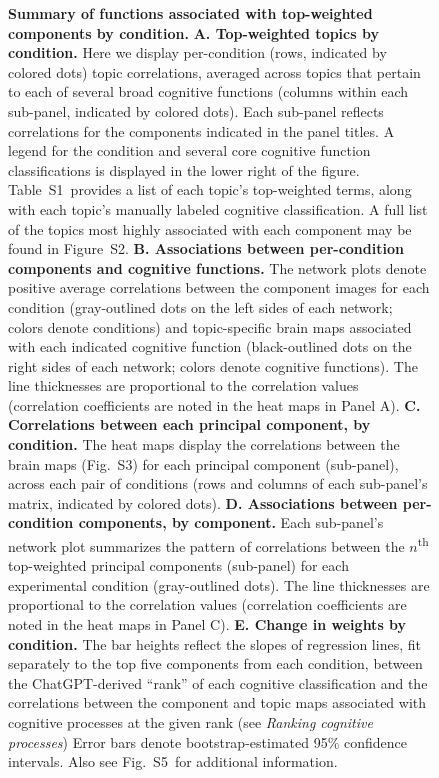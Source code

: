 \documentclass[english, 11pt]{article}
\newcommand{\topTerms}{S2}
\newcommand{\componentBrains}{S3}
\newcommand{\neurosynthFull}{S5}
\newcommand{\topics}{S1}
\begin{document}
\begin{figure}[tp]
\caption{\textbf{Summary of functions associated with top-weighted components
by condition.} \textbf{A. Top-weighted topics by condition.} Here we display
per-condition (rows, indicated by colored dots) topic correlations, averaged
across topics that pertain to each of several broad cognitive functions
(columns within each sub-panel, indicated by colored dots). Each sub-panel
reflects correlations for the components indicated in the panel titles. A
legend for the condition and several core cognitive function classifications is
displayed in the lower right of the figure. Table~\topics~provides a list of
each topic's top-weighted terms, along with each topic's manually labeled
cognitive classification. A full list of the topics most highly associated with
each component may be found in Figure~\topTerms. \textbf{B. Associations
between per-condition components and cognitive functions.} The network plots
denote positive average correlations between the component images for each
condition (gray-outlined dots on the left sides of each network; colors denote
conditions) and topic-specific brain maps associated with each indicated
cognitive function (black-outlined dots on the right sides of each network;
colors denote cognitive functions). The line thicknesses are proportional to
the correlation values (correlation coefficients are noted in the heat maps in
Panel A). \textbf{C. Correlations between each principal component, by
condition.} The heat maps display the correlations between the brain maps
(Fig.~\componentBrains) for each principal component (sub-panel), across each
pair of conditions (rows and columns of each sub-panel's matrix, indicated by
colored dots). \textbf{D. Associations between per-condition components, by
component.} Each sub-panel's network plot summarizes the pattern of
correlations between the $n$\textsuperscript{th} top-weighted principal
components (sub-panel) for each experimental condition (gray-outlined dots).
The line thicknesses are proportional to the correlation values (correlation
coefficients are noted in the heat maps in Panel C). \textbf{E. Change in
weights by condition.} The bar heights reflect the slopes of regression lines,
fit separately to the top five components from each condition, between the
ChatGPT-derived ``rank'' of each cognitive classification and the correlations
between the component and topic maps associated with cognitive processes at the
given rank (see \textit{Ranking cognitive processes}) Error bars denote
bootstrap-estimated 95\% confidence intervals. Also see
Fig.~\neurosynthFull~for additional information.}

\label{fig:neurosynth-summary}
\end{figure}
\end{document}
